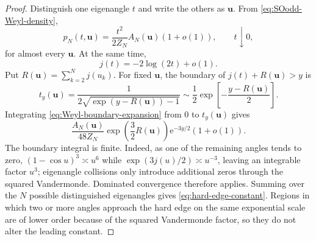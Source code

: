 \documentclass[10pt,a4paper]{amsart}
\newcommand{\e}{\mathrm{e}}
\theoremstyle{plain}
\theoremstyle{remark}
\begin{document}
\begin{proof}
Distinguish one eigenangle $t$ and write the others as $\mathbf u$.  From \eqref{eq:SOodd-Weyl-density},
\begin{equation}
  p_N(t,\mathbf u)
  =\frac{t^2}{2Z_N}A_N(\mathbf u)(1+o(1)),
  \qquad t\downarrow0,
  \label{eq:Weyl-boundary-expansion}
\end{equation}
for almost every $\mathbf u$.  At the same time,
\begin{equation}
  j(t)=-2\log(2t)+o(1).
  \label{eq:j-hard-edge-asymptotic}
\end{equation}
Put $R(\mathbf u)=\sum_{k=2}^{N}j(u_k)$.  For fixed $\mathbf u$, the boundary of
$j(t)+R(\mathbf u)>y$ is
\begin{equation}
  t_y(\mathbf u)
  =\frac1{2\sqrt{\exp(y-R(\mathbf u))-1}}
  \sim\frac12\exp\!\left[-\frac{y-R(\mathbf u)}2\right].
\end{equation}
Integrating \eqref{eq:Weyl-boundary-expansion} from $0$ to $t_y(\mathbf u)$ gives
\begin{equation}
  \frac{A_N(\mathbf u)}{48Z_N}
  \exp\!\left(\frac32R(\mathbf u)\right)
  \e^{-3y/2}(1+o(1)).
\end{equation}
The boundary integral is finite.  Indeed, as one of the remaining angles tends to zero,
$(1-\cos u)^3\asymp u^6$ while $\exp(3j(u)/2)\asymp u^{-3}$, leaving an integrable factor $u^3$; eigenangle collisions only introduce additional zeros through the squared Vandermonde.  Dominated convergence therefore applies.  Summing over the $N$ possible distinguished eigenangles gives \eqref{eq:hard-edge-constant}.  Regions in which two or more angles approach the hard edge on the same exponential scale are of lower order because of the squared Vandermonde factor, so they do not alter the leading constant.
\end{proof}
\end{document}
